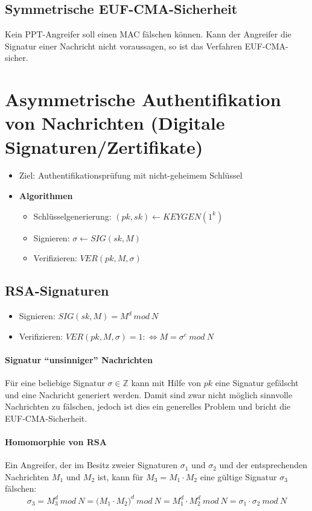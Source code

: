 \subsection{Symmetrische EUF-CMA-Sicherheit}
Kein PPT-Angreifer soll einen MAC fälschen können. Kann der Angreifer die Signatur einer Nachricht nicht voraussagen, so ist das Verfahren EUF-CMA-sicher.



\section{Asymmetrische Authentifikation von Nachrichten (Digitale Signaturen/Zertifikate)}
\begin{itemize}
 	\item Ziel: Authentifikationsprüfung mit nicht-geheimem Schlüssel
 	\item \textbf{Algorithmen}
 	\begin{itemize}
 		\item Schlüsselgenerierung: \((pk,sk) \leftarrow KEYGEN(1^k)\)
 		\item Signieren: \(\sigma \leftarrow SIG(sk,M)\)
 		\item Verifizieren: \(VER(pk,M,\sigma)\)
 	\end{itemize}
\end{itemize}


\subsection{RSA-Signaturen}
\begin{itemize}
	\item Signieren: \(SIG(sk,M) = M^d~mod~N\)
	\item Verifizieren: \(VER(pk,M,\sigma)=1 :\Leftrightarrow M = \sigma^e~mod~N\)
\end{itemize}

\paragraph{Signatur "`unsinniger"' Nachrichten}
Für eine beliebige Signatur \(\sigma \in \mathbb{Z}\) kann mit Hilfe von \(pk\) eine Signatur gefälscht und eine Nachricht generiert werden. Damit sind zwar nicht möglich sinnvolle Nachrichten zu fälschen, jedoch ist dies ein generelles Problem und bricht die EUF-CMA-Sicherheit.

\paragraph{Homomorphie von RSA}
Ein Angreifer, der im Besitz zweier Signaturen \(\sigma_1\) und \(\sigma_2\) und der entsprechenden Nachrichten \(M_1\) und \(M_2\) ist, kann für \(M_3 = M_1 \cdot M_2\) eine gültige Signatur \(\sigma_3\) fälschen:
\[\sigma_3 = M^d_3~mod~N = \big(M_1 \cdot M_2\big)^d~mod~N = M_1^d \cdot M_2^d~mod~N = \sigma_1 \cdot \sigma_2~mod~N\]

